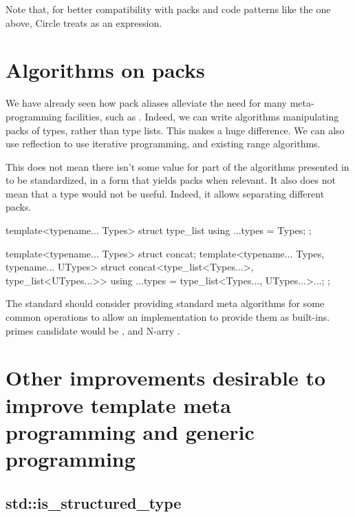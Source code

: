 \documentclass{wg21}
\begin{document}
Note that, for better compatibility with packs and code patterns like the one above, Circle treats  as an expression.

\section{Algorithms on packs}

We have already seen how pack aliases alleviate the need for many meta-programming facilities,
such as .
Indeed, we can write algorithms manipulating packs of types, rather than type lists.
This makes a huge difference.
We can also use reflection to use iterative programming, and existing range algorithms.

This does not mean there isn't some value for part of the algorithms presented in 
to be standardized, in a form that yields packs when relevant.
It also does not mean that a  type would not be useful.
Indeed, it allows separating different packs.

\begin{colorblock}
template<typename... Types>
struct type_list{
    using ...types = Types;
};

template<typename... Types>
struct concat;
template<typename... Types, typename... UTypes>
struct concat<type_list<Types...>, type_list<UTypes...>> {
    using ...types = type_list<Types..., UTypes...>...;
};
\end{colorblock}

The standard should consider providing standard meta algorithms for some common operations to allow an implementation to provide them as built-ins. primes candidate would be , and N-arry .



\section{Other improvements desirable to improve template meta programming and generic programming}

\subsection{std::is_structured_type}
\end{document}
